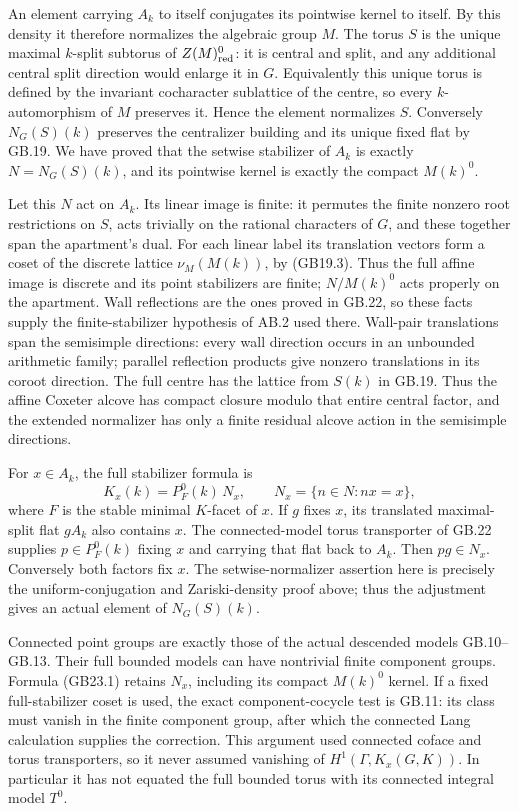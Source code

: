 \documentclass[
  11pt,
]{article}
\begin{document}
An element carrying \(A_k\) to itself conjugates its pointwise kernel to
itself. By this density it therefore normalizes the algebraic group
\(M\). The torus \(S\) is the unique maximal \(k\)-split subtorus of
\(Z(M)^0_{\rm red}\): it is central and split, and any additional
central split direction would enlarge it in \(G\). Equivalently this
unique torus is defined by the invariant cocharacter sublattice of the
centre, so every \(k\)-automorphism of \(M\) preserves it. Hence the
element normalizes \(S\). Conversely \(N_G(S)(k)\) preserves the
centralizer building and its unique fixed flat by GB.19. We have proved
that the setwise stabilizer of \(A_k\) is exactly \(N=N_G(S)(k)\), and
its pointwise kernel is exactly the compact \(M(k)^0\).

Let this \(N\) act on \(A_k\). Its linear image is finite: it permutes
the finite nonzero root restrictions on \(S\), acts trivially on the
rational characters of \(G\), and these together span the apartment's
dual. For each linear label its translation vectors form a coset of the
discrete lattice \(\nu_M(M(k))\), by (GB19.3). Thus the full affine
image is discrete and its point stabilizers are finite; \(N/M(k)^0\)
acts properly on the apartment. Wall reflections are the ones proved in
GB.22, so these facts supply the finite-stabilizer hypothesis of AB.2
used there. Wall-pair translations span the semisimple directions: every
wall direction occurs in an unbounded arithmetic family; parallel
reflection products give nonzero translations in its coroot direction.
The full centre has the lattice from \(S(k)\) in GB.19. Thus the affine
Coxeter alcove has compact closure modulo that entire central factor,
and the extended normalizer has only a finite residual alcove action in
the semisimple directions.

For \(x\in A_k\), the full stabilizer formula is \[
                 K_x(k)=P_F^0(k)\,N_x,\qquad
                 N_x=\{n\in N:nx=x\},                       \tag{GB23.1}
\] where \(F\) is the stable minimal \(K\)-facet of \(x\). If \(g\)
fixes \(x\), its translated maximal-split flat \(gA_k\) also contains
\(x\). The connected-model torus transporter of GB.22 supplies
\(p\in P_F^0(k)\) fixing \(x\) and carrying that flat back to \(A_k\).
Then \(pg\in N_x\). Conversely both factors fix \(x\). The
setwise-normalizer assertion here is precisely the uniform-conjugation
and Zariski-density proof above; thus the adjustment gives an actual
element of \(N_G(S)(k)\).

Connected point groups are exactly those of the actual descended models
GB.10--GB.13. Their full bounded models can have nontrivial finite
component groups. Formula (GB23.1) retains \(N_x\), including its
compact \(M(k)^0\) kernel. If a fixed full-stabilizer coset is used, the
exact component-cocycle test is GB.11: its class must vanish in the
finite component group, after which the connected Lang calculation
supplies the correction. This argument used connected coface and torus
transporters, so it never assumed vanishing of \(H^1(\Gamma,K_x(G,K))\).
In particular it has not equated the full bounded torus with its
connected integral model \(T^0\).
\end{document}
